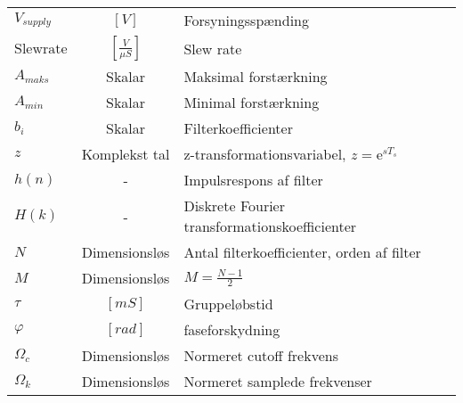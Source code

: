 \begin{table}[h!]
\begin{threeparttable}
\begin{tabular}{l c p{}}
			$V_{supply}$ & $\left[\si{V}\right]$ & Forsyningsspænding \\
			$\mathrm{Slew rate}$ & $\left[\si{\frac{V}{\mu S}}\right]$ & Slew rate \\
			$A_{maks}$ & Skalar & Maksimal forstærkning \\
			$A_{min}$ & Skalar & Minimal forstærkning\\
			$b_i$ & Skalar & Filterkoefficienter \\
			$z$ & Komplekst tal & z-transformationsvariabel, $z = \mathrm{e}^{sT_s}$\\
			$h(n)$ & - & Impulsrespons af filter \\
			$H(k)$ & - & Diskrete Fourier transformationskoefficienter\\
			$N$ & Dimensionsløs & Antal filterkoefficienter, orden af filter\\
			$M$ & Dimensionsløs & $M = \frac{N - 1}{2}$\\
			$\tau$ & $\left[\si{mS}\right]$ & Gruppeløbstid\\
			$\varphi$ & $\left[\si{rad}\right]$ & faseforskydning\\
			$\Omega_c$ & Dimensionsløs & Normeret cutoff frekvens\\
			$\Omega_k$ & Dimensionsløs & Normeret samplede frekvenser\\
			
									
							
									
			
		\end{tabular}
	
	\end{threeparttable}
\end{table}
			